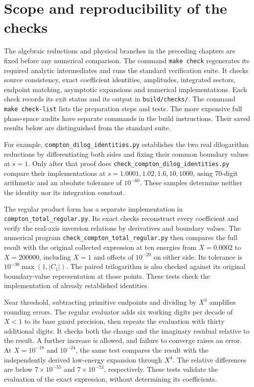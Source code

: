 \section{Scope and reproducibility of the checks}
The algebraic reductions and physical branches in the preceding chapters
are fixed before any numerical comparison. The command \texttt{make check}
regenerates its required analytic intermediates and runs the standard
verification suite. It checks source consistency, exact coefficient
identities, amplitudes, integrated sectors, endpoint matching, asymptotic
expansions and numerical implementations. Each check records its exit
status and its output in \nolinkurl{build/checks/}. The command
\texttt{make check-list} lists the preparation steps and tests.
The more expensive full phase-space audits have separate commands in
the build instructions. Their saved results below are distinguished
from the standard suite.

For example, \nolinkurl{compton_dilog_identities.py} establishes the two
real dilogarithm reductions by differentiating both sides and fixing
their common boundary values at $s=1$. Only after that proof does
\nolinkurl{check_compton_dilog_identities.py} compare their implementations
at $s=1.0001,1.02,1.6,10,1000$, using 70-digit arithmetic and an
absolute tolerance of $10^{-60}$. These samples determine neither the
identity nor its integration constant.

The regular product form has a separate implementation in
\nolinkurl{compton_total_regular.py}. Its exact checks reconstruct every
coefficient and verify the real-axis inversion relations by derivatives
and boundary values. The numerical program
\nolinkurl{check_compton_total_regular.py} then compares the full result
with the original collected expression at ten energies from $X=0.0002$
to $X=200000$, including $X=1$ and offsets of $10^{-20}$ on either side.
Its tolerance is $10^{-30}\max(1,|C_1|)$. The paired trilogarithm is also
checked against its original boundary-value representation at those
points. These tests check the implementation of already established
identities.

Near threshold, subtracting primitive endpoints and dividing by $X^3$
amplifies rounding errors. The regular evaluator adds six working digits
per decade of $X<1$ to its base guard precision, then repeats the
evaluation with thirty additional digits. It checks both the change
and the imaginary residual relative to the result. A further increase
is allowed, and failure to converge raises an error.
At $X=10^{-18}$ and $10^{-24}$, the same test compares the result
with the independently derived low-energy expansion through $X^4$.
The relative differences are below $7\times10^{-55}$ and
$7\times10^{-73}$, respectively. These tests validate the evaluation
of the exact expression, without determining its coefficients.

